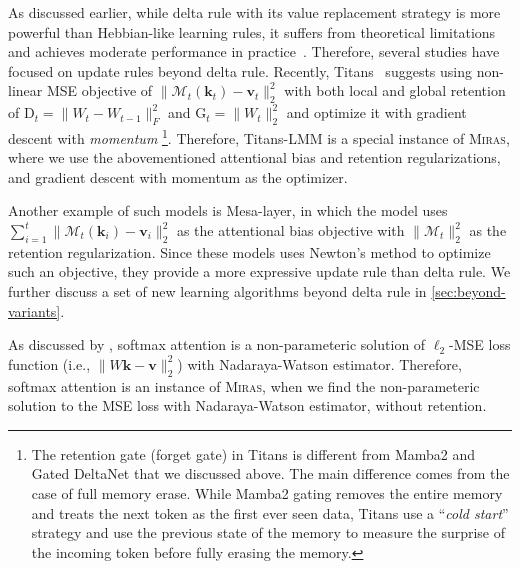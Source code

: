 \documentclass{article}
\newcommand{\citep}{\parencite}
\newcommand{\citet}{\textcite}
\newcommand{\framework}[0]{\textsc{Miras}}
\newcommand{\vk}[0]{\mathbf{k}}
\newcommand{\vvv}[0]{\mathbf{v}}
\newcommand{\M}[0]{\mathcal{M}}
\theoremstyle{plain}
\theoremstyle{definition}
\theoremstyle{remark}
\newcommand{\head}[1]{\vspace{1.7mm}\noindent{{\textcolor{c2}{\bf #1.}}}}
\begin{document}
\head{Beyond Delta Rule}
As discussed earlier, while delta rule with its value replacement strategy is more powerful than Hebbian-like learning rules, it suffers from theoretical limitations~\citep{irie2023practical} and achieves moderate performance in practice~\citep{yang2024parallelizing}. Therefore, several studies have focused on update rules beyond delta rule. Recently, Titans~\citep{behrouz2024titans} suggests using non-linear MSE objective of $\|\M_t(\vk_t) - \vvv_t\|^2_2$ with both local and global retention of $\mbox{D}_t = \|W_t - W_{t-1} \|_F^2$ and $\mbox{G}_t = \|W_t \|^2_2$ and optimize it with gradient descent with \emph{momentum} \footnote{The retention gate (forget gate) in Titans is different from Mamba2 and Gated DeltaNet that we discussed above. The main difference comes from the case of full memory erase. While Mamba2 gating removes the entire memory and treats the next token as the first ever seen data, Titans use a ``\emph{cold start}'' strategy and use the previous state of the memory to measure the surprise of the incoming token before fully erasing the memory.}. Therefore, Titans-LMM is a special instance of \framework, where we use the abovementioned attentional bias and retention regularizations, and gradient descent with momentum as the optimizer. 

Another example of such models is Mesa-layer, in which the model uses $\sum_{i = 1}^{t} \|\M_t(\vk_i) - \vvv_i\|^2_2$ as the attentional bias objective with $\|\M_t\|_2^{2}$ as the retention regularization. Since these models uses Newton's method to optimize such an objective, they provide a more expressive update rule than delta rule. We further discuss a set of new learning algorithms beyond delta rule in \autoref{sec:beyond-variants}. 


\head{Attention}
As discussed by \citet{sun2024learning}, softmax attention is a non-parameteric solution of $\ell_2$-MSE loss function (i.e., $\|W \vk - \vvv\|_2^2$) with Nadaraya-Watson estimator. Therefore, softmax attention is an instance of \framework, when we find the non-parameteric solution to the MSE loss with Nadaraya-Watson estimator, without retention. 
\end{document}
